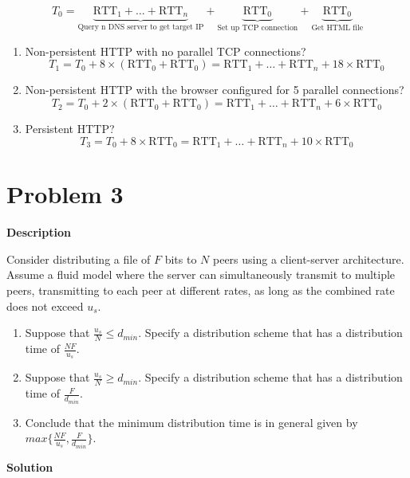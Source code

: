 \documentclass[12pt,letterpaper]{ctexart}
\begin{document}
$$
T_0 = \underbrace{\text{RTT}_{1} + \dots + \text{RTT}_{n}}_{\text{Query n DNS server to get target IP}} + \underbrace{\text{RTT}_0}_{\text{Set up TCP connection}} + \underbrace{\text{RTT}_0}_{\text{Get HTML file}}
$$

\begin{enumerate}
  \item Non-persistent HTTP with no parallel TCP connections?
  $$
    T_1 = T_0 + 8 \times (\text{RTT}_{0} + \text{RTT}_{0}) = \text{RTT}_{1} + \dots + \text{RTT}_{n} + 18 \times \text{RTT}_{0}
  $$

  \item Non-persistent HTTP with the browser configured for 5 parallel connections?
  $$
    T_2 = T_0 + 2 \times (\text{RTT}_{0} + \text{RTT}_{0}) = \text{RTT}_{1} + \dots + \text{RTT}_{n} + 6 \times \text{RTT}_{0}
  $$

  \item Persistent HTTP?
  $$
    T_3 = T_0 + 8 \times \text{RTT}_{0} = \text{RTT}_{1} + \dots + \text{RTT}_{n} + 10 \times \text{RTT}_{0}
  $$

\end{enumerate}

\section*{Problem 3}

{\bf Description}

Consider distributing a file of $F$ bits to $N$ peers using a client-server architecture. Assume a fluid model where the server can simultaneously transmit to multiple peers, transmitting to each peer at different rates, as long as the combined rate does not exceed $u_s$.

\begin{enumerate}
  \item Suppose that $ \frac{u_s}{N} \leq d_{min}$. Specify a distribution scheme that has a distribution time of $\frac{NF}{u_s}$.
  \item Suppose that $ \frac{u_s}{N} \geq d_{min}$. Specify a distribution scheme that has a distribution time of $\frac{F}{d_{min}}$.
  \item Conclude that the minimum distribution time is in general given by $max \{\frac{NF}{u_s}, \frac{F}{d_{min}}\}$.
\end{enumerate}

{\bf Solution}
\end{document}
